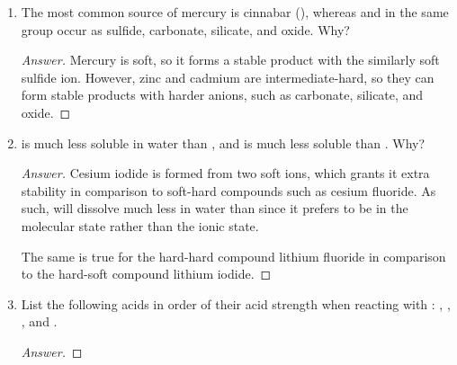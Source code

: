 \documentclass[../psets.tex]{subfiles}
\begin{document}
\begin{enumerate}[label={\Roman*)}]
\begin{enumerate}[label={\textbf{6.\arabic*}}]
\begin{enumerate}[label={\textbf{\alph*.}}]
\begin{proof}[Answer]
            \end{proof}
            \item Propose a structure of the product (see \cite{bib:pset4-613}).
            \begin{proof}[Answer]
                ${\color{white}hi}$
                \begin{center}
                \end{center}
            \end{proof}
        \end{enumerate}
        \newpage
        \setcounter{enumii}{24}
        \item The most common source of mercury is cinnabar (), whereas  and  in the same group occur as sulfide, carbonate, silicate, and oxide. Why?
        \begin{proof}[Answer]
            Mercury is soft, so it forms a stable product with the similarly soft sulfide ion. However, zinc and cadmium are intermediate-hard, so they can form stable products with harder anions, such as carbonate, silicate, and oxide.
        \end{proof}
        \newpage
        \setcounter{enumii}{29}
        \item {} is much less soluble in water than , and  is much less soluble than . Why?
        \begin{proof}[Answer]
            Cesium iodide is formed from two soft ions, which grants it extra stability in comparison to soft-hard compounds such as cesium fluoride. As such,  will dissolve much less in water than  since it prefers to be in the molecular state rather than the ionic state.\par
            The same is true for the hard-hard compound lithium fluoride in comparison to the hard-soft compound lithium iodide.
        \end{proof}
        \newpage
        \setcounter{enumii}{36}
        \item List the following acids in order of their acid strength when reacting with : , , , and .
        \begin{proof}[Answer]

\end{proof}
\end{enumerate}
\end{enumerate}
\end{document}

